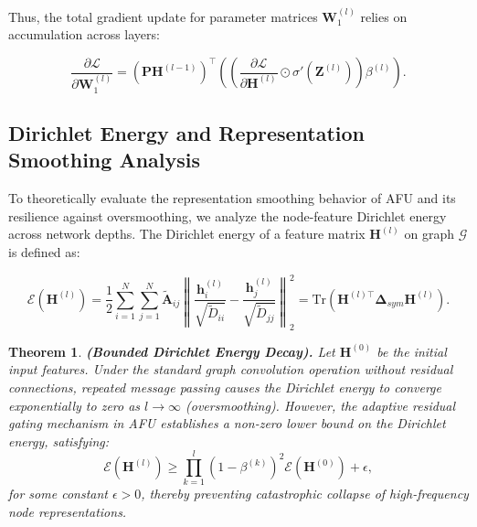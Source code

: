 \documentclass[10pt,twocolumn]{article}
\newtheorem{theorem}{Theorem}
\begin{document}
Thus, the total gradient update for parameter matrices $\mathbf{W}_1^{(l)}$ relies on accumulation across layers:

\begin{equation}
\frac{\partial \mathcal{L}}{\partial \mathbf{W}_1^{(l)}} = \left( \mathbf{P} \mathbf{H}^{(l-1)} \right)^\top \left( \left( \frac{\partial \mathcal{L}}{\partial \mathbf{H}^{(l)}} \odot \sigma'(\mathbf{Z}^{(l)}) \right) \beta^{(l)} \right).
\end{equation}

\subsection{Dirichlet Energy and Representation Smoothing Analysis}

To theoretically evaluate the representation smoothing behavior of \textsc{AFU} and its resilience against oversmoothing, we analyze the node-feature Dirichlet energy across network depths. The Dirichlet energy of a feature matrix $\mathbf{H}^{(l)}$ on graph $\mathcal{G}$ is defined as:

\begin{equation}
\mathcal{E}(\mathbf{H}^{(l)}) = \frac{1}{2} \sum_{i=1}^{N} \sum_{j=1}^{N} \tilde{\mathbf{A}}_{ij} \left\| \frac{\mathbf{h}_i^{(l)}}{\sqrt{\tilde{D}_{ii}}} - \frac{\mathbf{h}_j^{(l)}}{\sqrt{\tilde{D}_{jj}}} \right\|_2^2 = \text{Tr}\left( \mathbf{H}^{(l)\top} \mathbf{\Delta}_{sym} \mathbf{H}^{(l)} \right).
\end{equation}

\begin{theorem}
\textbf{(Bounded Dirichlet Energy Decay).} Let $\mathbf{H}^{(0)}$ be the initial input features. Under the standard graph convolution operation without residual connections, repeated message passing causes the Dirichlet energy to converge exponentially to zero as $l \to \infty$ (oversmoothing). However, the adaptive residual gating mechanism in \textsc{AFU} establishes a non-zero lower bound on the Dirichlet energy, satisfying:
\begin{equation}
\mathcal{E}(\mathbf{H}^{(l)}) \ge \prod_{k=1}^{l} (1 - \beta^{(k)})^2 \mathcal{E}(\mathbf{H}^{(0)}) + \epsilon,
\end{equation}
for some constant $\epsilon > 0$, thereby preventing catastrophic collapse of high-frequency node representations.
\end{theorem}
\end{document}
